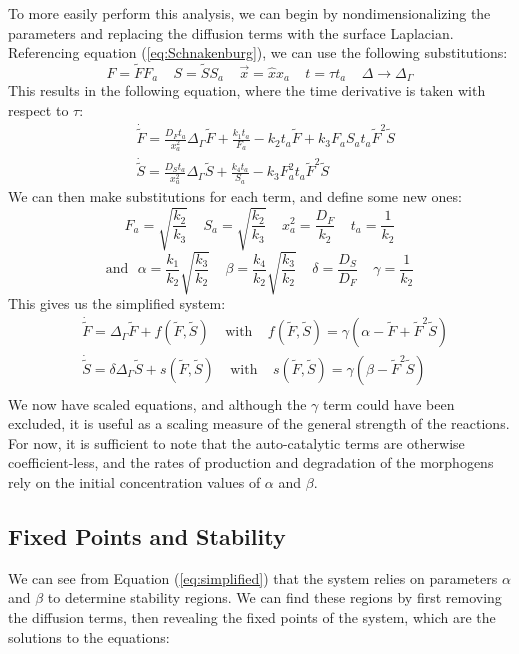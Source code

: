 \documentclass[12pt]{article}
\begin{document}
To more easily perform this analysis, we can begin by nondimensionalizing the parameters and replacing the diffusion terms with the surface Laplacian. Referencing equation (\ref{eq:Schnakenburg}), we can use the following substitutions:
$$ F = \tilde{F}F_a ~~~~~ S = \tilde{S}S_a ~~~~~  \vec{x} = \hat{x}x_a ~~~~~  t = \tau t_a ~~~~~ \Delta\rightarrow\Delta_\Gamma$$
\noindent This results in the following equation, where the time derivative is taken with respect to $\tau$:
\begin{align*}
   &\dot{\tilde{F}} = \frac{D_Ft_a}{x_a^2}\Delta_\Gamma\tilde{F} + 
   \frac{k_1t_a}{F_a} - k_2t_a\tilde{F} + k_3F_aS_at_a\tilde{F}^2\tilde{S} \\
   &\dot{\tilde{S}} = \frac{D_St_a}{x_a^2}\Delta_\Gamma\tilde{S} +
    \frac{k_4t_a}{S_a} - k_3F_a^2t_a\tilde{F}^2\tilde{S} 
\end{align*} 
\noindent We can then make substitutions for each term, and define some new ones:
$$  F_a =  \sqrt{\frac{k_2}{k_3}} ~~~~~ S_a = \sqrt{\frac{k_2}{k_3}} ~~~~~ x_a^2 = \frac{D_F}{k_2} ~~~~~ t_a = \frac{1}{k_2} $$
$$ \text{and} ~~~ \alpha = \frac{k_1}{k_2}\sqrt{\frac{k_3}{k_2}} ~~~~~ \beta = \frac{k_4}{k_2}\sqrt{\frac{k_3}{k_2}} ~~~~~ \delta = \frac{D_S}{D_F} ~~~~~ \gamma = \frac{1}{k_2} $$
\noindent This gives us the simplified system:
\begin{equation}
\label{eq:simplified}
\begin{aligned}
    & \dot{\tilde{F}} = \Delta_\Gamma\tilde{F} + 
     f(\tilde{F},\tilde{S}) ~~~~~\text{with} ~~~~~ f(\tilde{F},\tilde{S}) = \gamma\left(\alpha - \tilde{F} + \tilde{F}^2\tilde{S}\right) \\
    & \dot{\tilde{S}} = \delta\Delta_\Gamma\tilde{S} + 
    s(\tilde{F},\tilde{S}) ~~~~~\text{with} ~~~~~ s(\tilde{F},\tilde{S}) = \gamma\left(\beta - \tilde{F}^2\tilde{S}\right) \\
\end{aligned}
\end{equation}
We now have scaled equations, and although the $\gamma$ term could have been excluded, it is useful as a scaling measure of the general strength of the reactions. For now, it is sufficient to note that the auto-catalytic terms are otherwise coefficient-less, and the rates of production and degradation of the morphogens rely on the initial concentration values of $\alpha$ and $\beta$.

\pagebreak
\subsection{Fixed Points and Stability}\label{fixed_points}
We can see from Equation (\ref{eq:simplified}) that the system relies on parameters $\alpha$ and $\beta$ to determine stability regions. We can find these regions by first removing the diffusion terms, then revealing the fixed points of the system, which are the solutions to the equations:
\end{document}
